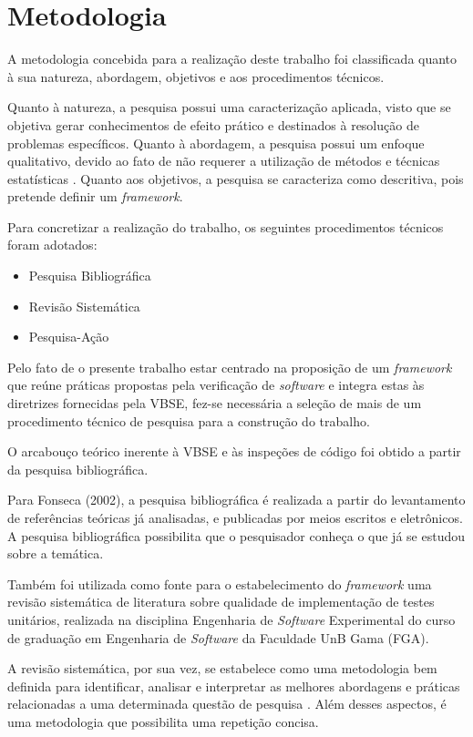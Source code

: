 \chapter{Metodologia}

A metodologia concebida para a realização deste trabalho foi classificada quanto à sua natureza, abordagem, objetivos e aos procedimentos técnicos.

Quanto à natureza, a pesquisa possui uma caracterização aplicada, visto que se objetiva gerar conhecimentos de efeito prático e destinados à resolução de problemas específicos. Quanto à abordagem, a pesquisa possui um enfoque qualitativo, devido ao fato de não requerer a utilização de métodos e técnicas estatísticas \cite{metodologia}. Quanto aos objetivos, a pesquisa se caracteriza como descritiva, pois pretende definir um \textit{framework}.

Para concretizar a realização do trabalho, os seguintes procedimentos técnicos foram adotados:

\begin{itemize}
	\item Pesquisa Bibliográfica
	\item Revisão Sistemática
	\item Pesquisa-Ação
\end{itemize}

Pelo fato de o presente trabalho estar centrado na proposição de um \textit{framework} que reúne práticas propostas pela verificação de \textit{software} e integra estas às diretrizes fornecidas pela VBSE, fez-se necessária a seleção de mais de um procedimento técnico de pesquisa para a construção do trabalho.
 
O arcabouço teórico inerente à VBSE e às inspeções de código foi obtido a partir da pesquisa bibliográfica.

Para Fonseca (2002), a pesquisa bibliográfica é realizada a partir do levantamento de referências teóricas já analisadas, e publicadas por meios escritos e eletrônicos. A pesquisa bibliográfica possibilita que o pesquisador conheça o que já se estudou sobre a temática.

Também foi utilizada como fonte para o estabelecimento do \textit{framework} uma revisão sistemática de literatura sobre qualidade de implementação de testes unitários, realizada na disciplina Engenharia de \textit{Software} Experimental do curso de graduação em Engenharia de \textit{Software} da Faculdade UnB Gama (FGA). 

A revisão sistemática, por sua vez, se estabelece como uma metodologia bem definida para identificar, analisar e interpretar as melhores abordagens e práticas relacionadas a uma determinada questão de pesquisa \cite{sistematica}. Além desses aspectos, é uma metodologia que possibilita uma repetição concisa.

